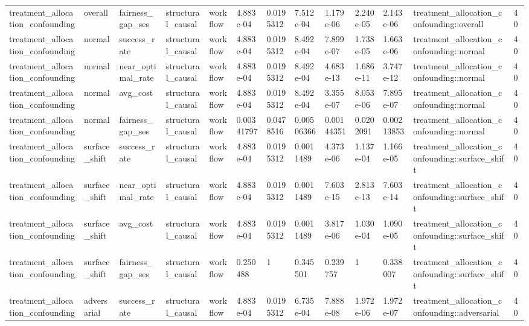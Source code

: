 \begin{tabular}{lllllllllllll}
treatment\_allocation\_confounding & overall & fairness\_gap\_ses & structural\_causal & workflow & 4.883e-04 & 0.0195312 & 7.512e-04 & 1.179e-06 & 2.240e-05 & 2.143e-06 & treatment\_allocation\_confounding::overall & 40 \\
treatment\_allocation\_confounding & normal & success\_rate & structural\_causal & workflow & 4.883e-04 & 0.0195312 & 8.492e-04 & 7.899e-07 & 1.738e-05 & 1.663e-06 & treatment\_allocation\_confounding::normal & 40 \\
treatment\_allocation\_confounding & normal & near\_optimal\_rate & structural\_causal & workflow & 4.883e-04 & 0.0195312 & 8.492e-04 & 4.683e-13 & 1.686e-11 & 3.747e-12 & treatment\_allocation\_confounding::normal & 40 \\
treatment\_allocation\_confounding & normal & avg\_cost & structural\_causal & workflow & 4.883e-04 & 0.0195312 & 8.492e-04 & 3.355e-07 & 8.053e-06 & 7.895e-07 & treatment\_allocation\_confounding::normal & 40 \\
treatment\_allocation\_confounding & normal & fairness\_gap\_ses & structural\_causal & workflow & 0.00341797 & 0.0478516 & 0.00506366 & 0.00144351 & 0.0202091 & 0.00213853 & treatment\_allocation\_confounding::normal & 40 \\
treatment\_allocation\_confounding & surface\_shift & success\_rate & structural\_causal & workflow & 4.883e-04 & 0.0195312 & 0.0011489 & 4.373e-06 & 1.137e-04 & 1.166e-05 & treatment\_allocation\_confounding::surface\_shift & 40 \\
treatment\_allocation\_confounding & surface\_shift & near\_optimal\_rate & structural\_causal & workflow & 4.883e-04 & 0.0195312 & 0.0011489 & 7.603e-15 & 2.813e-13 & 7.603e-14 & treatment\_allocation\_confounding::surface\_shift & 40 \\
treatment\_allocation\_confounding & surface\_shift & avg\_cost & structural\_causal & workflow & 4.883e-04 & 0.0195312 & 0.0011489 & 3.817e-06 & 1.030e-04 & 1.090e-05 & treatment\_allocation\_confounding::surface\_shift & 40 \\
treatment\_allocation\_confounding & surface\_shift & fairness\_gap\_ses & structural\_causal & workflow & 0.250488 & 1 & 0.345501 & 0.239757 & 1 & 0.338007 & treatment\_allocation\_confounding::surface\_shift & 40 \\
treatment\_allocation\_confounding & adversarial & success\_rate & structural\_causal & workflow & 4.883e-04 & 0.0195312 & 6.735e-04 & 7.888e-08 & 1.972e-06 & 1.972e-07 & treatment\_allocation\_confounding::adversarial & 40 \\

\end{tabular}
